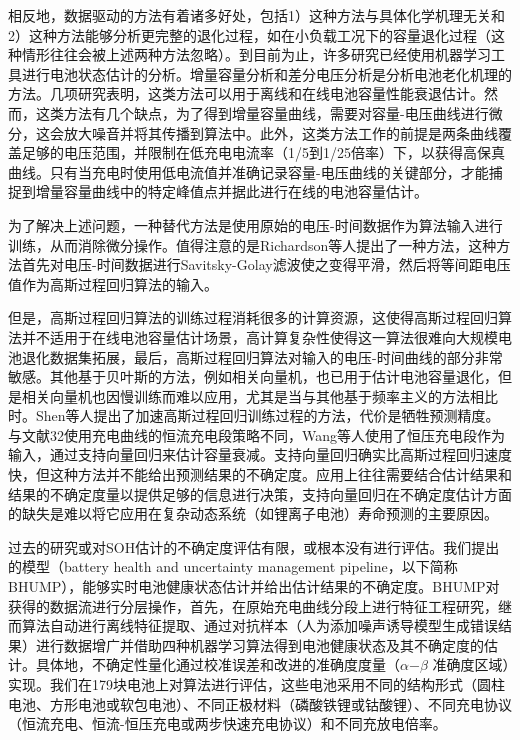 \documentclass{article}
\begin{document}
相反地，数据驱动的方法有着诸多好处，包括1）这种方法与具体化学机理无关和2）这种方法能够分析更完整的退化过程，如在小负载工况下的容量退化过程（这种情形往往会被上述两种方法忽略）。到目前为止，许多研究已经使用机器学习工具进行电池状态估计的分析。增量容量分析和差分电压分析是分析电池老化机理的方法。几项研究表明，这类方法可以用于离线和在线电池容量性能衰退估计。然而，这类方法有几个缺点，为了得到增量容量曲线，需要对容量-电压曲线进行微分，这会放大噪音并将其传播到算法中。此外，这类方法工作的前提是两条曲线覆盖足够的电压范围，并限制在低充电电流率（1/5到1/25倍率）下，以获得高保真曲线。只有当充电时使用低电流值并准确记录容量-电压曲线的关键部分，才能捕捉到增量容量曲线中的特定峰值点并据此进行在线的电池容量估计。

为了解决上述问题，一种替代方法是使用原始的电压-时间数据作为算法输入进行训练，从而消除微分操作。值得注意的是Richardson等人提出了一种方法，这种方法首先对电压-时间数据进行Savitsky-Golay滤波使之变得平滑，然后将等间距电压值作为高斯过程回归算法的输入。

但是，高斯过程回归算法的训练过程消耗很多的计算资源，这使得高斯过程回归算法并不适用于在线电池容量估计场景，高计算复杂性使得这一算法很难向大规模电池退化数据集拓展，最后，高斯过程回归算法对输入的电压-时间曲线的部分非常敏感。其他基于贝叶斯的方法，例如相关向量机，也已用于估计电池容量退化，但是相关向量机也因慢训练而难以应用，尤其是当与其他基于频率主义的方法相比时。Shen等人提出了加速高斯过程回归训练过程的方法，代价是牺牲预测精度。与文献32使用充电曲线的恒流充电段策略不同，Wang等人使用了恒压充电段作为输入，通过支持向量回归来估计容量衰减。支持向量回归确实比高斯过程回归速度快，但这种方法并不能给出预测结果的不确定度。应用上往往需要结合估计结果和结果的不确定度量以提供足够的信息进行决策，支持向量回归在不确定度估计方面的缺失是难以将它应用在复杂动态系统（如锂离子电池）寿命预测的主要原因。

过去的研究或对SOH估计的不确定度评估有限，或根本没有进行评估。我们提出的模型（battery health and uncertainty management pipeline，以下简称BHUMP），能够实时电池健康状态估计并给出估计结果的不确定度。BHUMP对获得的数据流进行分层操作，首先，在原始充电曲线分段上进行特征工程研究，继而算法自动进行离线特征提取、通过对抗样本（人为添加噪声诱导模型生成错误结果）进行数据增广并借助四种机器学习算法得到电池健康状态及其不确定度的估计。具体地，不确定性量化通过校准误差和改进的准确度度量（$\alpha$−$\beta$ 准确度区域）实现。我们在179块电池上对算法进行评估，这些电池采用不同的结构形式（圆柱电池、方形电池或软包电池）、不同正极材料（磷酸铁锂或钴酸锂）、不同充电协议（恒流充电、恒流-恒压充电或两步快速充电协议）和不同充放电倍率。
\end{document}
